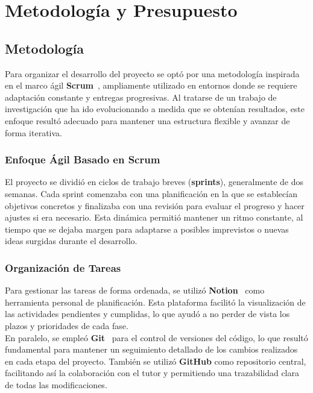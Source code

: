 \chapter{Metodología y Presupuesto}\label{ch:metodologia-y-presupuesto}
\section{Metodología}\label{sec:metodologia}
Para organizar el desarrollo del proyecto se optó por una metodología inspirada en el marco ágil
\textbf{Scrum}~\cite{noauthor_scrum_nodate}, ampliamente utilizado en entornos donde se requiere adaptación constante y
entregas progresivas.
Al tratarse de un trabajo de investigación que ha ido evolucionando a medida que se obtenían resultados, este enfoque
resultó adecuado para mantener una estructura flexible y avanzar de forma iterativa.

\subsection{Enfoque Ágil Basado en Scrum}\label{subsec:enfoque-agil-basado-en-scrum}
El proyecto se dividió en ciclos de trabajo breves (\textbf{sprints}), generalmente de dos semanas.
Cada sprint comenzaba con una planificación en la que se establecían objetivos concretos y finalizaba con una revisión
para evaluar el progreso y hacer ajustes si era necesario.
Esta dinámica permitió mantener un ritmo constante, al tiempo que se dejaba margen para adaptarse a posibles
imprevistos o nuevas ideas surgidas durante el desarrollo.

\subsection{Organización de Tareas}\label{subsec:organizacion-de-tareas}
Para gestionar las tareas de forma ordenada, se utilizó \textbf{Notion}~\cite{noauthor_notion_nodate} como herramienta
personal de planificación.
Esta plataforma facilitó la visualización de las actividades pendientes y cumplidas, lo que ayudó a no perder de vista
los plazos y prioridades de cada fase. \\[6pt]

En paralelo, se empleó \textbf{Git}~\cite{chacon_pro_2014} para el control de versiones del código, lo que resultó
fundamental para mantener un seguimiento detallado de los cambios realizados en cada etapa del proyecto.
También se utilizó \textbf{GitHub} como repositorio central, facilitando así la colaboración con el tutor y permitiendo
una trazabilidad clara de todas las modificaciones. \\[6pt]

